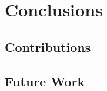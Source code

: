 
\chapter{Conclusions} 
\label{ch:conc} 

\section{Contributions}
\label{sec:conc-contributions}


\section{Future Work}
\label{sec:conc-future_work}